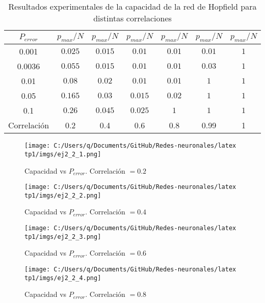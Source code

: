 \documentclass[11pt]{article} %
\begin{document}
\begin{table}[h!]
\centering
\begin{tabular}{|c|c|c|c|c|c|c|}
\hline
$P_{error}$ & $p_{max}/N$ & $p_{max}/N$  & $p_{max}/N$ & $p_{max}/N$  &   $p_{max}/N$& $p_{max}/N$ \\ \hline
0.001  &   $0.025$    &    $0.015$   &   $0.01$    &    $0.01$   & $0.01$ &  $1$    \\ \hline
0.0036 &    $0.055$   &     $0.015$  &    $0.01$   &  $0.01$     &  $0.03$ &$1$     \\ \hline
0.01   &    $0.08$  &   $0.02$    &   $0.01$    &   $0.01$    &  $1$  &$1$    \\ \hline
0.05   &    $0.165$   &  $0.03$     &    $0.015$   &   $0.02$    &  $1$ &$1$     \\ \hline
0.1    &   $0.26$   &   $0.045$    &   $0.025$    &   $1$    &  $1$ &$1$     \\ \hline  \hline
Correlación  &0.2  &0.4&0.6&0.8&0.99&1 \\ \hline

\end{tabular}
\caption{Resultados experimentales de la capacidad de la red de Hopfield para distintas correlaciones}
\label{tab:correlaciones}
\end{table}

\begin{figure}[h!]
    \centering
    \texttt{[image: C:/Users/q/Documents/GitHub/Redes-neuronales/latex tp1/imgs/ej2\_2\_1.png]}
    \caption{Capacidad vs $P_{error}$. Correlación $= 0.2$}
    \label{fig:ej2_2_1}
\end{figure}

\begin{figure}[h!]
    \centering
    \texttt{[image: C:/Users/q/Documents/GitHub/Redes-neuronales/latex tp1/imgs/ej2\_2\_2.png]}
    \caption{Capacidad vs $P_{error}$. Correlación $= 0.4$}
    \label{fig:ej2_2_2}
\end{figure}

\begin{figure}[h!]
    \centering
    \texttt{[image: C:/Users/q/Documents/GitHub/Redes-neuronales/latex tp1/imgs/ej2\_2\_3.png]}
    \caption{Capacidad vs $P_{error}$. Correlación $= 0.6$}
    \label{fig:ej2_2_3}
\end{figure}

\begin{figure}[h!]
    \centering
    \texttt{[image: C:/Users/q/Documents/GitHub/Redes-neuronales/latex tp1/imgs/ej2\_2\_4.png]}
    \caption{Capacidad vs $P_{error}$. Correlación $= 0.8$}
    \label{fig:ej2_2_4}
\end{figure}
\end{document}

